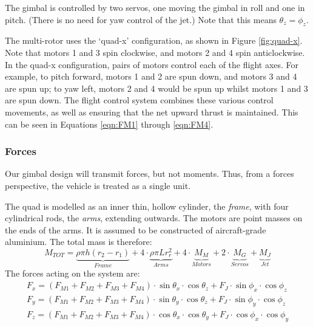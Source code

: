 \documentclass[11pt]{article}
\begin{document}
The gimbal is controlled by two servos, one moving the gimbal in roll and one in pitch. (There is no need for yaw control of the jet.)  Note that this means $\theta_z = \phi_z$.

The multi-rotor uses the `quad-x' configuration, as shown in Figure \ref{fig:quad-x}. Note that motors 1 and 3 spin clockwise, and motors 2 and 4 spin anticlockwise. In the quad-x configuration, pairs of motors control each of the flight axes. For example, to pitch forward, motors 1 and 2 are spun down, and motors 3 and 4 are spun up; to yaw left, motors 2 and 4 would be spun up whilst motors 1 and 3 are spun down. The flight control system combines these various control movements, as well as ensuring that the net upward thrust is maintained. This can be seen in Equations \ref{eqn:FM1} through \ref{eqn:FM4}.


\subsubsection{Forces}\label{sec:Forces}
Our gimbal design will transmit forces, but not moments. Thus, from a forces perspective, the vehicle is treated as a single unit.

The quad is modelled as an inner thin, hollow cylinder, the \emph{frame}, with four cylindrical rods, the \emph{arms}, extending outwards. The motors are point masses on the ends of the arms. It is assumed to be constructed of aircraft-grade aluminium. The total mass is therefore:
\begin{equation}
    M_{TOT} = \underbrace{\rho\pi h (r_2-r_1)}_{Frame} + 4\cdot\underbrace{\rho\pi L r_r^2}_{Arms} + 4\cdot\underbrace{M_M}_{Motors} + 2\cdot\underbrace{M_G}_{Servos} + \underbrace{M_J}_{Jet} \label{eqn:total_mass}
\end{equation}
The forces acting on the system are:
\begin{eqnarray}
    F_x = (F_{M1} + F_{M2} + F_{M3} + F_{M4})\cdot\sin{\theta_x}\cdot\cos{\theta_z} +  F_J\cdot\sin{\phi_x}\cdot\cos{\phi_z} \\
    F_y = (F_{M1} + F_{M2} + F_{M3} + F_{M4})\cdot\sin{\theta_y}\cdot\cos{\theta_z} +  F_J\cdot\sin{\phi_y}\cdot\cos{\phi_z} \\
    F_z = (F_{M1} + F_{M2} + F_{M3} + F_{M4})\cdot\cos{\theta_x}\cdot\cos{\theta_y} +  F_J\cdot\cos{\phi_x}\cdot\cos{\phi_y}
\end{eqnarray}
\end{document}
